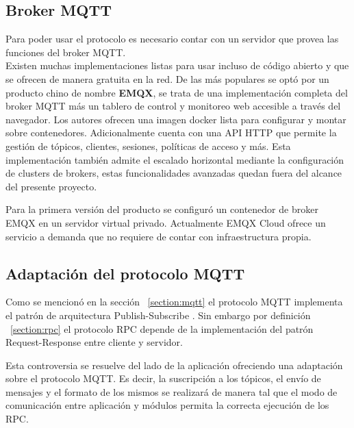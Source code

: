 \subsection{Broker MQTT}
Para poder usar el protocolo es necesario contar con un servidor que provea las funciones del broker MQTT.\\
Existen muchas implementaciones listas para usar incluso de código abierto y que se ofrecen de manera gratuita en la red.
De las más populares se optó por un producto chino de nombre \textbf{EMQX}, se trata de una implementación completa del broker MQTT
más un tablero de control y monitoreo web accesible a través del navegador. 
Los autores ofrecen una imagen docker lista para configurar y montar sobre contenedores.
Adicionalmente cuenta con una API HTTP que permite la gestión de tópicos, clientes, sesiones, políticas de acceso y más. Esta implementación también admite el escalado horizontal mediante la configuración de clusters de brokers, estas funcionalidades avanzadas quedan fuera del alcance del presente proyecto.

Para la primera versión del producto se configuró un contenedor de broker EMQX en un servidor virtual privado.
Actualmente EMQX Cloud ofrece un servicio a demanda que no requiere de contar con infraestructura propia.

\subsection{Adaptación del protocolo MQTT}
Como se mencionó en la sección ~\ref{section:mqtt} el protocolo MQTT implementa el patrón de arquitectura Publish-Subscribe .
Sin embargo por definición ~\ref{section:rpc} el protocolo RPC depende de la implementación del patrón Request-Response entre cliente y servidor. 

Esta controversia se resuelve del lado de la aplicación ofreciendo una adaptación sobre el protocolo MQTT.
Es decir, la suscripción a los tópicos, el envío de mensajes y el formato de los mismos se realizará de manera tal que el modo de comunicación entre aplicación y módulos permita la correcta ejecución de los RPC.

